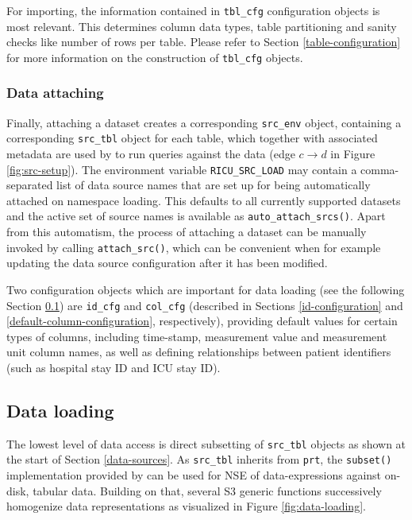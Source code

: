 \documentclass[
  notitle,
  nojss,
  noheadings]{jss}
\begin{document}
For importing, the information contained in \texttt{tbl\_cfg}
configuration objects is most relevant. This determines column data
types, table partitioning and sanity checks like number of rows per
table. Please refer to Section \ref{table-configuration} for more
information on the construction of \texttt{tbl\_cfg} objects.

\hypertarget{data-attaching}{%
\subsubsection{Data attaching}\label{data-attaching}}

Finally, attaching a dataset creates a corresponding \texttt{src\_env}
object, containing a corresponding \texttt{src\_tbl} object for each
table, which together with associated metadata are used by  to
run queries against the data (edge \(c \to d\) in Figure
\ref{fig:src-setup}). The environment variable \texttt{RICU\_SRC\_LOAD}
may contain a comma-separated list of data source names that are set up
for being automatically attached on namespace loading. This defaults to
all currently supported datasets and the active set of source names is
available as \texttt{auto\_attach\_srcs()}. Apart from this automatism,
the process of attaching a dataset can be manually invoked by calling
\texttt{attach\_src()}, which can be convenient when for example
updating the data source configuration after it has been modified.

Two configuration objects which are important for data loading (see the
following Section \ref{data-loading}) are \texttt{id\_cfg} and
\texttt{col\_cfg} (described in Sections \ref{id-configuration} and
\ref{default-column-configuration}, respectively), providing default
values for certain types of columns, including time-stamp, measurement
value and measurement unit column names, as well as defining
relationships between patient identifiers (such as hospital stay ID and
ICU stay ID).

\hypertarget{data-loading}{%
\subsection{Data loading}\label{data-loading}}

The lowest level of data access is direct subsetting of
\texttt{src\_tbl} objects as shown at the start of Section
\ref{data-sources}. As \texttt{src\_tbl} inherits from \texttt{prt}, the
\texttt{subset()} implementation provided by  can be used for
NSE of data-expressions against on-disk, tabular data. Building on that,
several S3 generic functions successively homogenize data
representations as visualized in Figure \ref{fig:data-loading}.
\end{document}
